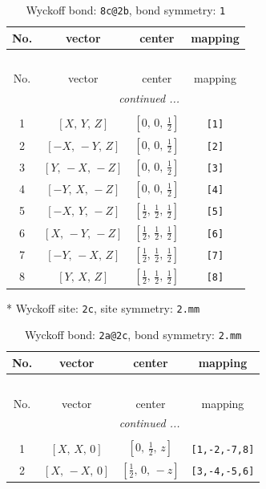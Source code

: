 \documentclass[fleqn,8pt]{jsarticle}
\begin{document}
\begin{longtable}{cccc}
\caption{Wyckoff bond: {\tt 8c@2b}, bond symmetry: {\tt 1}}
 \\
 \hline \hline
No. & vector & center & mapping \\ \hline \endfirsthead

\multicolumn{3}{l}{\tablename\ \thetable{}} \\
 \hline \hline
No. & vector & center & mapping \\ \hline \endhead

 \hline \hline
\multicolumn{3}{r}{\footnotesize\it continued ...} \\ \endfoot

 \hline \hline
\multicolumn{3}{r}{} \\ \endlastfoot

1 & $\left[ X,\, Y,\, Z \right]$ & $\left[ 0,\, 0,\, \frac{1}{2} \right]$ & {\tt [1]} \\ \hline
2 & $\left[ - X,\, - Y,\, Z \right]$ & $\left[ 0,\, 0,\, \frac{1}{2} \right]$ & {\tt [2]} \\ \hline
3 & $\left[ Y,\, - X,\, - Z \right]$ & $\left[ 0,\, 0,\, \frac{1}{2} \right]$ & {\tt [3]} \\ \hline
4 & $\left[ - Y,\, X,\, - Z \right]$ & $\left[ 0,\, 0,\, \frac{1}{2} \right]$ & {\tt [4]} \\ \hline
5 & $\left[ - X,\, Y,\, - Z \right]$ & $\left[ \frac{1}{2},\, \frac{1}{2},\, \frac{1}{2} \right]$ & {\tt [5]} \\ \hline
6 & $\left[ X,\, - Y,\, - Z \right]$ & $\left[ \frac{1}{2},\, \frac{1}{2},\, \frac{1}{2} \right]$ & {\tt [6]} \\ \hline
7 & $\left[ - Y,\, - X,\, Z \right]$ & $\left[ \frac{1}{2},\, \frac{1}{2},\, \frac{1}{2} \right]$ & {\tt [7]} \\ \hline
8 & $\left[ Y,\, X,\, Z \right]$ & $\left[ \frac{1}{2},\, \frac{1}{2},\, \frac{1}{2} \right]$ & {\tt [8]} \\
\end{longtable}
* Wyckoff site: {\tt 2c}, site symmetry: {\tt 2.mm}
\renewcommand{\arraystretch}{1.2}
\begin{longtable}{cccc}
\caption{Wyckoff bond: {\tt 2a@2c}, bond symmetry: {\tt 2.mm}}
 \\
 \hline \hline
No. & vector & center & mapping \\ \hline \endfirsthead

\multicolumn{3}{l}{\tablename\ \thetable{}} \\
 \hline \hline
No. & vector & center & mapping \\ \hline \endhead

 \hline \hline
\multicolumn{3}{r}{\footnotesize\it continued ...} \\ \endfoot

 \hline \hline
\multicolumn{3}{r}{} \\ \endlastfoot

1 & $\left[ X,\, X,\, 0 \right]$ & $\left[ 0,\, \frac{1}{2},\, z \right]$ & {\tt [1,-2,-7,8]} \\ \hline
2 & $\left[ X,\, - X,\, 0 \right]$ & $\left[ \frac{1}{2},\, 0,\, - z \right]$ & {\tt [3,-4,-5,6]} \\
\end{longtable}
\end{document}
